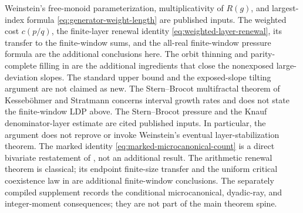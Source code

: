 \else
\begin{remark}
Weinstein's free-monoid parameterization, multiplicativity of \(R(g)\), and
largest-index formula \eqref{eq:generator-weight-length} are published inputs.
The weighted cost \(c(p/q)\), the finite-layer renewal identity
\eqref{eq:weighted-layer-renewal}, its transfer to the finite-window sums, and
the all-real finite-window pressure formula are the additional conclusions
here.  The orbit thinning and parity-complete filling in
 are the additional ingredients that close the
nonexposed large-deviation slopes.  The standard upper bound and the
exposed-slope tilting argument are not claimed as new.  The Stern--Brocot
multifractal theorem of Kesseb\"ohmer and Stratmann
\cite{KessebohmerStratmann2004,KessebohmerStratmann2007} concerns interval
growth rates and does not state the finite-window LDP above.  The
Stern--Brocot pressure and the Knauf
denominator-layer estimate
are cited published inputs.  In
particular, the argument does not reprove or invoke Weinstein's eventual
layer-stabilization theorem.  The marked identity
\eqref{eq:marked-microcanonical-count} is a direct bivariate restatement of
, not an additional result.  The
arithmetic renewal theorem is classical; its endpoint finite-size transfer
and the uniform critical coexistence law in
 are additional finite-window
conclusions.
The separately compiled supplement records the conditional microcanonical,
dyadic-ray, and integer-moment consequences; they are not part of the main
theorem spine.
\end{remark}
\fi
